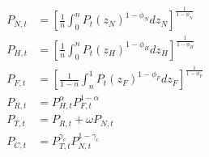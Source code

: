 \begin{align}
    P_{N, t} & =\left[\frac{1}{n} \int_0^n P_t\left(z_N\right)^{1-\phi_N} d z_N\right]^{\frac{1}{1-\phi_N}}   \\
    P_{H, t} & =\left[\frac{1}{n} \int_0^n P_t\left(z_H\right)^{1-\phi_H} d z_H\right]^{\frac{1}{1-\phi_H}}   \\
    P_{F, t} & =\left[\frac{1}{1-n} \int_n^1 P_t\left(z_F\right)^{1-\phi_F} d z_F\right]^{\frac{1}{1-\phi_F}} \\
    P_{R, t} & =P_{H, t}^\alpha P_{F, t}^{1-\alpha}                                                           \\
    P_{T, t} & =P_{R, t}+\omega P_{N, t}                                                                      \\
    P_{C, t} & =P_{T, t}^{\gamma_c} P_{N, t}^{1-\gamma_c}
\end{align}